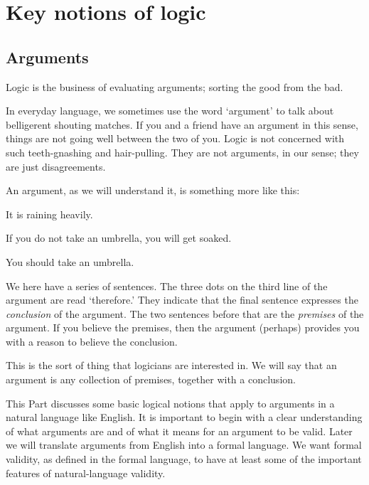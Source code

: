 \part{Key notions of logic}
\label{ch.intro}


\chapter{Arguments}
\label{s:Arguments}

Logic is the business of evaluating arguments; sorting the good from the bad. 

In everyday language, we sometimes use the word `argument' to talk about belligerent shouting matches.  If you and a friend have an argument in this sense, things are not going well between the two of you. Logic is not concerned with such teeth-gnashing and hair-pulling. They are not arguments, in our sense; they are just disagreements.

An argument, as we will understand it, is something more like this:
	\begin{earg}\label{argRaining}
		\item[] It is raining heavily.
		\item[] If you do not take an umbrella, you will get soaked.
		\item[\therefore] You should take an umbrella.
	\end{earg}
We here have a series of sentences. The three dots on the third line of the argument are read `therefore.' They indicate that the final sentence expresses the \emph{conclusion} of the argument. The two sentences before that are the \emph{premises} of the argument. If you believe the premises, then the argument (perhaps) provides you with a reason to believe the conclusion. 

This is the sort of thing that logicians are interested in. We will say that an argument is any collection of premises, together with a conclusion. 

This Part discusses some basic logical notions that apply to arguments in a natural language like English. It is important to begin with a clear understanding of what arguments are and of what it means for an argument to be valid. Later we will translate arguments from English into a formal language. We want formal validity, as defined in the formal language, to have at least some of the important features of natural-language validity.

